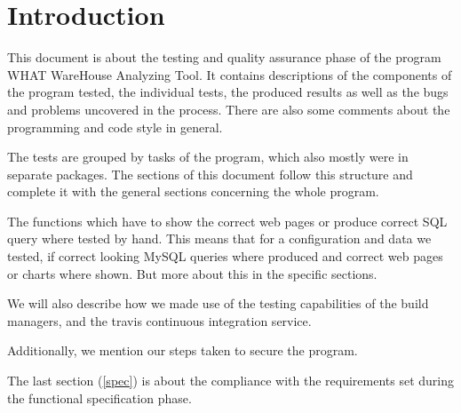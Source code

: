 \section{Introduction}

This document is about the testing and quality assurance phase of the program WHAT WareHouse Analyzing Tool.
It contains descriptions of the components of the program tested, the individual tests,
the produced results as well as the bugs and problems uncovered in the process. 
There are also some comments about the programming and code style in general. 

The tests are grouped by tasks of the program, which also mostly were in separate packages. 
The sections of this document follow this structure and complete it with the 
general sections concerning the whole program. %

The functions which have to show the correct web pages or produce correct SQL query where tested by hand. 
This means that for a configuration and data we tested, 
if correct looking MySQL queries where produced and correct web pages or charts where shown. 
But more about this in the specific sections.

We will also describe how we made use of the testing capabilities of the build managers, 
and the travis continuous integration service.

Additionally, we mention our steps taken to secure the program.


The last section (\ref{spec}) is about the compliance with the requirements set during the functional specification
phase.

 
